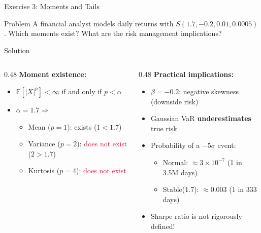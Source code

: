 \documentclass[9pt, aspectratio=169, t]{beamer}
\theoremstyle{definition}
\newcommand{\E}{\mathbb{E}}
\begin{document}
\begin{frame}{Exercise 3: Moments and Tails}
\begin{block}{Problem}
A financial analyst models daily returns with $S(1.7, -0.2, 0.01, 0.0005)$. Which moments exist? What are the risk management implications?
\end{block}

\begin{exampleblock}{Solution}
\begin{columns}[T]
\begin{column}{0.48\textwidth}
\textbf{Moment existence:}
\begin{itemize}
    \item $\E[|X|^p] < \infty$ if and only if $p < \alpha$
    \item $\alpha = 1.7 \Rightarrow$
    \begin{itemize}
        \item Mean ($p=1$): \textcolor{Forest}{exists} ($1 < 1.7$)
        \item Variance ($p=2$): \textcolor{Crimson}{does not exist} ($2 > 1.7$)
        \item Kurtosis ($p=4$): \textcolor{Crimson}{does not exist}
    \end{itemize}
\end{itemize}
\end{column}
\begin{column}{0.48\textwidth}
\textbf{Practical implications:}
\begin{itemize}
    \item $\beta = -0.2$: negative skewness (downside risk)
    \item Gaussian VaR \textbf{underestimates} true risk
    \item Probability of a $-5\sigma$ event:
    \begin{itemize}
        \item Normal: $\approx 3 \times 10^{-7}$ (1 in 3.5M days)
        \item Stable(1.7): $\approx 0.003$ (1 in 333 days)
    \end{itemize}
    \item Sharpe ratio is not rigorously defined!
\end{itemize}
\end{column}
\end{columns}
\end{exampleblock}
\end{frame}

\end{document}
